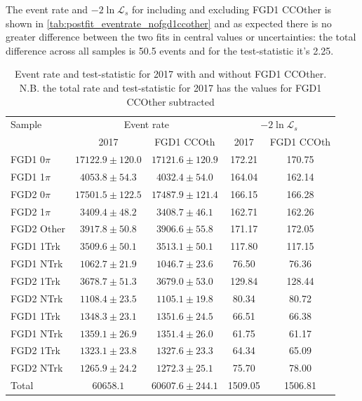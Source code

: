 The event rate and $-2\ln\mathcal{L}_s$ for including and excluding FGD1 CCOther is shown in \autoref{tab:postfit_eventrate_nofgd1ccother} and as expected there is no greater difference between the two fits in central values or uncertainties: the total difference across all samples is 50.5 events and for the test-statistic it's 2.25.
\begin{table}[h]
	\centering
	\begin{tabular}{ l | c c | c c }
		\hline
		\hline
		Sample 		& \multicolumn{2}{c|}{Event rate} & \multicolumn{2}{c}{$-2\ln{\mathcal{L}_s}$} \\
		& 2017 & FGD1 CCOth & 2017 & FGD1 CCOth\\
		\hline
		FGD1 0$\pi$ 	& $17122.9\pm120.0$ & $17121.6\pm120.9$ & 172.21  & 170.75 \\ 
		FGD1 1$\pi$ 	& $4053.8\pm54.3$   & $4032.4\pm54.0$ & 164.04 & 162.14	\\ 
		\hline
		FGD2 0$\pi$ 	& $17501.5\pm122.5$ & $17487.9\pm121.4$ & 166.15  & 166.28 \\ 
		FGD2 1$\pi$ 	& $3409.4\pm48.2$   & $3408.7\pm46.1$ &  162.71 & 162.26	\\ 
		FGD2 Other 	& $3917.8\pm50.8$  & $3906.6\pm55.8$ & 171.17 & 172.05	\\ 
		\hline
		FGD1 1Trk 	& $3509.6\pm50.1$  & $3513.1\pm50.1$ & 117.80 &117.15	\\ 
		FGD1 NTrk 	& $1062.7\pm21.9$  & $1046.7\pm23.6$ & 76.50 	& 76.36\\ 
		FGD2 1Trk 	& $3678.7\pm51.3$  & $3679.0\pm53.0$ & 129.84 	& 128.44 \\ 
		FGD2 NTrk 	& $1108.4\pm23.5$  & $1105.1\pm19.8$ & 80.34 	& 80.72 \\ 
		\hline
		FGD1 \numu 1Trk & $1348.3\pm23.1$  & $1351.6\pm24.5$ & 66.51 	& 66.38 \\
		FGD1 \numu NTrk & $1359.1\pm26.9$  & $1351.4\pm26.0$ & 61.75 	& 61.17 \\
		FGD2 \numu 1Trk & $1323.1\pm23.8$  & $1327.6\pm23.3$ & 64.34 	& 65.09 \\
		FGD2 \numu NTrk	& $1265.9\pm24.2$  & $1272.3\pm25.1$ & 75.70 	& 78.00 \\
		\hline
		Total 		& $60658.1$ & $60607.6\pm244.1$ & 1509.05 & 1506.81 \\ 
		\hline
		\hline
	\end{tabular}
	\caption{Event rate and test-statistic for 2017 with and without FGD1 CCOther. N.B. the total rate and test-statistic for 2017 has the values for FGD1 CCOther subtracted}
	\label{tab:postfit_eventrate_nofgd1ccother}
\end{table}

